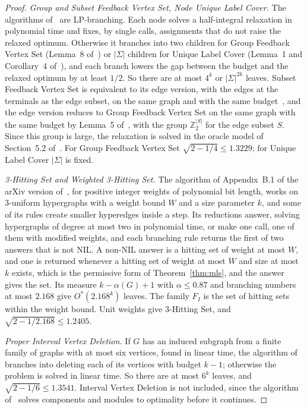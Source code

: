 \documentclass[11pt]{article}
\theoremstyle{remark}
\begin{document}
\begin{proof}
\emph{Group and Subset Feedback Vertex Set, Node Unique Label Cover.} The algorithms of~\cite{IWY16} are LP-branching. Each node solves a half-integral relaxation in polynomial time and fixes, by single calls, assignments that do not raise the relaxed optimum. Otherwise it branches into two children for Group Feedback Vertex Set (Lemma~8 of~\cite{IWY16}) or $|\Sigma|$ children for Unique Label Cover (Lemma~1 and Corollary~4 of~\cite{IWY16}), and each branch lowers the gap between the budget and the relaxed optimum by at least $1/2$. So there are at most $4^k$ or $|\Sigma|^{2k}$ leaves. Subset Feedback Vertex Set is equivalent to its edge version, with the edges at the terminals as the edge subset, on the same graph and with the same budget~\cite{CPPW11}, and the edge version reduces to Group Feedback Vertex Set on the same graph with the same budget by Lemma~5 of~\cite{CPP16}, with the group $\mathbb{Z}_2^{|S|}$ for the edge subset $S$. Since this group is large, the relaxation is solved in the oracle model of Section~5.2 of~\cite{IWY16}. For Group Feedback Vertex Set $\sqrt{2 - 1/4} \le 1.3229$; for Unique Label Cover $|\Sigma|$ is fixed.

\emph{3-Hitting Set and Weighted 3-Hitting Set.} The algorithm of Appendix~B.1 of the arXiv version of~\cite{SZ15}, for positive integer weights of polynomial bit length, works on 3-uniform hypergraphs with a weight bound $W$ and a size parameter $k$, and some of its rules create smaller hyperedges inside a step. Its reductions answer, solving hypergraphs of degree at most two in polynomial time, or make one call, one of them with modified weights, and each branching rule returns the first of two answers that is not NIL. A non-NIL answer is a hitting set of weight at most $W$, and one is returned whenever a hitting set of weight at most $W$ and size at most $k$ exists, which is the permissive form of Theorem~\ref{thm:mls}, and the answer gives the set. Its measure $k - \alpha(G) + 1$ with $\alpha \le 0.87$ and branching numbers at most $2.168$ give $O^*(2.168^k)$ leaves. The family $F_I$ is the set of hitting sets within the weight bound. Unit weights give 3-Hitting Set, and $\sqrt{2 - 1/2.168} \le 1.2405$.

\emph{Proper Interval Vertex Deletion.} If $G$ has an induced subgraph from a finite family of graphs with at most six vertices, found in linear time, the algorithm of~\cite{Cao15} branches into deleting each of its vertices with budget $k-1$; otherwise the problem is solved in linear time. So there are at most $6^k$ leaves, and $\sqrt{2 - 1/6} \le 1.3541$. Interval Vertex Deletion is not included, since the algorithm of~\cite{Cao16} solves components and modules to optimality before it continues.


\end{proof}
\end{document}
